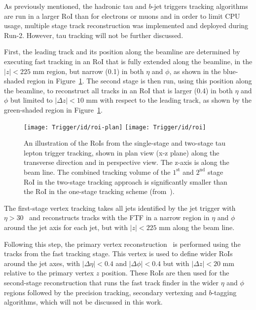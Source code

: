 				As previously mentioned, the hadronic tau and $b$-jet triggers tracking algorithms are run in a larger RoI than for electrons or muons and in order to limit CPU usage, multiple stage track reconstruction was implemented and deployed during Run-2. However, tau tracking will not be further discussed.

				First, the leading track and its position along the beamline are determined by executing fast tracking in an RoI that is fully extended along the beamline, in the $|z|<225$ mm region, but narrow (0.1) in both $\eta$ and $\phi$, as shown in the blue-shaded region in Figure~\ref{fig:idroi}. The second stage is then run, using this position along the beamline, to reconstruct all tracks in an RoI that is larger (0.4) in both $\eta$ and $\phi$ but limited to $|\Delta z|<10$ mm with respect to the leading track, as shown by the green-shaded region in Figure~\ref{fig:idroi}.

				\begin{figure}[!htb]
					\centering
					\texttt{[image: Trigger/id/roi-plan]}
					\texttt{[image: Trigger/id/roi]}
					\caption{An illustration of the RoIs from the single-stage and two-stage tau lepton trigger tracking, shown in plan view (x-z plane) along the transverse direction and in perspective view. The z-axis is along the beam line. The combined tracking volume of the $1^{\mathrm{st}}$ and $2^{\mathrm{nd}}$ stage RoI in the two-stage tracking approach is significantly smaller than the RoI in the one-stage tracking scheme (from~\cite{ATLASTrigger2015}).}
					\label{fig:idroi}
				\end{figure}

				The first-stage vertex tracking takes all jets identified by the jet trigger with $\eta > 30$ \GeV\ and reconstructs tracks with the FTF in a narrow region in $\eta$ and $\phi$ around the jet axis for each jet, but with $|z|<225$ mm along the beam line.
				
				Following this step, the primary vertex reconstruction~\cite{ATLAS-CONF-2010-069} is performed using the tracks from the fast tracking stage. This vertex is used to define wider RoIs around
				the jet axes, with $|\Delta\eta|<0.4$ and $|\Delta\phi|<0.4$ but with $|\Delta z|<20$ mm relative to the primary vertex $z$ position. These RoIs are then used for the second-stage 
				reconstruction that runs the fast track finder in the wider $\eta$ and $\phi$ regions followed by the precision tracking, secondary vertexing and $b$-tagging algorithms, which will not be discussed in this work.

